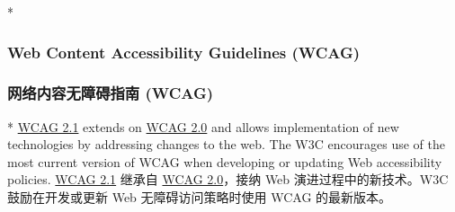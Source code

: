 \begin{paracol}{2} 
 
\switchcolumn[0]*%
\subsubsection{Web Content Accessibility Guidelines (WCAG)}
\switchcolumn
\subsubsection{网络内容无障碍指南 (WCAG)}
\switchcolumn[0]*%
\href{https://www.w3.org/TR/WCAG21/}{WCAG 2.1} extends on
\href{https://www.w3.org/TR/WCAG20/}{WCAG 2.0} and allows implementation
of new technologies by addressing changes to the web. The W3C encourages
use of the most current version of WCAG when developing or updating Web
accessibility policies.
\switchcolumn
\href{https://www.w3.org/TR/WCAG21/}{WCAG 2.1} 继承自
\href{https://www.w3.org/TR/WCAG20/}{WCAG 2.0}，接纳 Web
演进过程中的新技术。W3C 鼓励在开发或更新 Web 无障碍访问策略时使用 WCAG
的最新版本。
\end{paracol}


